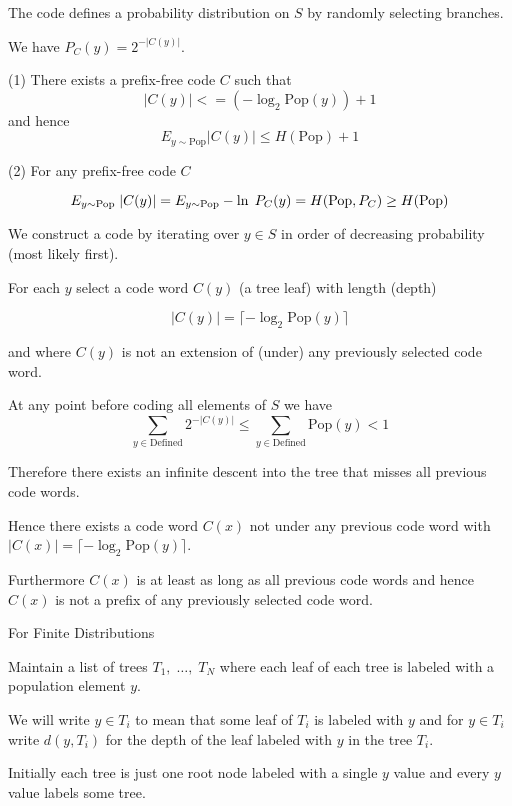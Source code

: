 \vfill
The code defines a probability distribution on $S$ by randomly selecting branches.

\vfill
We have $P_C(y) = 2^{-|C(y)|}$.


(1) There exists a prefix-free code $C$ such that
$$|C(y)| <= (- \log_2 \mathrm{Pop}(y)) + 1$$
and hence
$$E_{y\sim \mathrm{Pop}} |C(y)| \leq H(\mathrm{Pop}) +1$$

\vfill
(2) For any prefix-free code $C$

$$E_{y \sim \mathrm{Pop}}\;|C(y)| = E_{y \sim \mathrm{Pop}} -\ln \;P_C(y) = H(\mathrm{Pop},P_C) \geq H(\mathrm{Pop})$$


\vfill
We construct a code by iterating over $y \in S$ in order of decreasing probability (most likely first).

\vfill
For each $y$ select a code word $C(y)$ (a tree leaf) with length (depth)

\vfill
$$|C(y)| = \lceil - \log_2 \mathrm{Pop}(y)\rceil$$

\vfill
and where $C(y)$ is not an extension of (under) any previously selected code word.


At any point before coding all elements of $S$ we have
$$\sum_{y \in \mathrm{Defined}} 2^{-|C(y)|} \leq \sum_{y \in \mathrm{Defined}} \mathrm{Pop}(y) < 1$$

\vfill
Therefore there exists an infinite descent into the tree that misses all previous code words.

\vfill
Hence there exists a code word $C(x)$ not under any previous code word with
$|C(x)| = \lceil - \log_2 \mathrm{Pop}(y)\rceil$.

\vfill
Furthermore $C(x)$ is at least as long as all previous code words and hence $C(x)$ is not a prefix of any previously selected code word.

{For Finite Distributions}

Maintain a list of trees $T_1,\;\dots,\;T_N$ where each leaf of each tree is labeled with a population element $y$.

\vfill
We will write $y \in T_i$ to mean that some leaf of $T_i$ is labeled with $y$ and for $y \in T_i$ write $d(y,T_i)$ for the depth
of the leaf labeled with $y$ in the tree $T_i$.

\vfill
Initially each tree is just one root node labeled with a single $y$ value and every $y$ value labels some tree.

